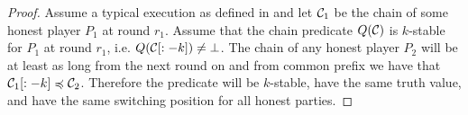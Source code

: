 \begin{proof}
    Assume a typical execution as defined in \cite{backbone} and let $\mathcal{C}_1$
    be the chain of some honest player $P_1$ at round $r_1$. Assume that the
    chain predicate $Q(\mathcal{C})$ is $k$-stable for $P_1$ at round $r_1$, i.e.
    $Q(\mathcal{C}[:-k]) \neq \bot$.  The chain of any honest player $P_2$ will be
    at least as long from the next round on and from common prefix we have that
    $\mathcal{C}_1[:-k] \preccurlyeq \mathcal{C}_2$. Therefore the predicate will be
    $k$-stable, have the same truth value, and have the same switching position
    for all honest parties.
    \Qed
\end{proof}
